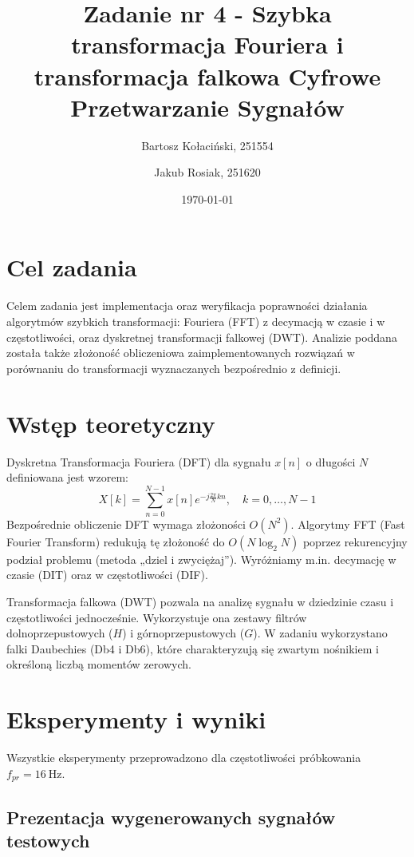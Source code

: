 \documentclass[12pt]{article}
\title{{\bf Zadanie nr 4 - Szybka transformacja Fouriera i transformacja falkowa}\linebreak
	Cyfrowe Przetwarzanie Sygnałów}
\author{Bartosz Kołaciński, 251554 \and Jakub Rosiak, 251620}
\date{\today}
\begin{document}
	\clearpage\maketitle
	\thispagestyle{empty}
	\newpage
	\setcounter{page}{1}

	\section{Cel zadania}
	Celem zadania jest implementacja oraz weryfikacja poprawności działania algorytmów szybkich transformacji: Fouriera (FFT) z decymacją w czasie i w częstotliwości, oraz dyskretnej transformacji falkowej (DWT). Analizie poddana została także złożoność obliczeniowa zaimplementowanych rozwiązań w porównaniu do transformacji wyznaczanych bezpośrednio z definicji.

	\section{Wstęp teoretyczny}
	Dyskretna Transformacja Fouriera (DFT) dla sygnału $x[n]$ o długości $N$ definiowana jest wzorem:
	\begin{equation}
		X[k] = \sum_{n=0}^{N-1} x[n] e^{-j\frac{2\pi}{N}kn}, \quad k = 0, \dots, N-1
	\end{equation}
	Bezpośrednie obliczenie DFT wymaga złożoności $O(N^2)$. Algorytmy FFT (Fast Fourier Transform) redukują tę złożoność do $O(N \log_2 N)$ poprzez rekurencyjny podział problemu (metoda „dziel i zwyciężaj”). Wyróżniamy m.in. decymację w czasie (DIT) oraz w częstotliwości (DIF).

	Transformacja falkowa (DWT) pozwala na analizę sygnału w dziedzinie czasu i częstotliwości jednocześnie. Wykorzystuje ona zestawy filtrów dolnoprzepustowych ($H$) i górnoprzepustowych ($G$). W zadaniu wykorzystano falki Daubechies (Db4 i Db6), które charakteryzują się zwartym nośnikiem i określoną liczbą momentów zerowych.

\section{Eksperymenty i wyniki}

Wszystkie eksperymenty przeprowadzono dla częstotliwości próbkowania $f_{pr} = 16\ \text{Hz}$.

\subsection{Prezentacja wygenerowanych sygnałów testowych}
\end{document}
